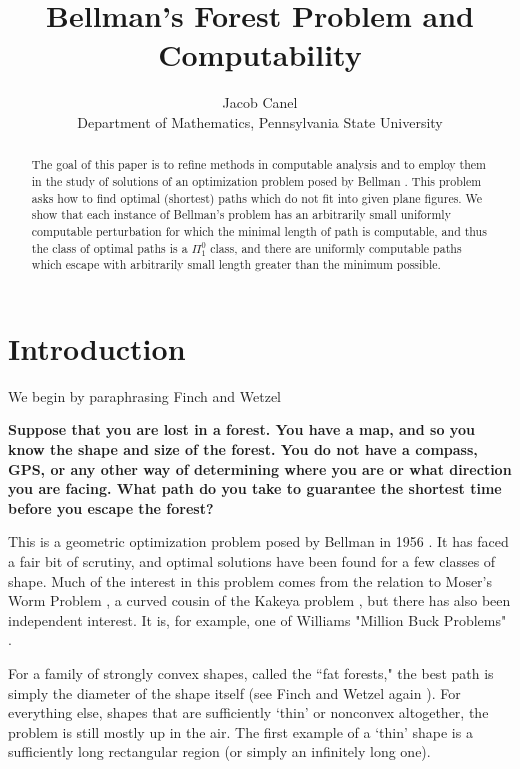 \documentclass{journal}
\title{Bellman's Forest Problem and Computability}
\author{Jacob Canel\\ Department of Mathematics, Pennsylvania State University}
\theoremstyle{definition}
\begin{document}
\begin{abstract}    %

The goal of this paper is to refine methods in computable analysis and to employ them in the study of solutions of an optimization problem posed by Bellman \cite{bell}. This problem asks how to find optimal (shortest) paths which do not fit into given plane figures. We show that each instance of Bellman's problem has an arbitrarily small uniformly computable perturbation for which the minimal length of path is computable, and thus the class of optimal paths is a $\Pi_1^0$ class, and there are uniformly computable paths which escape with arbitrarily small length greater than the minimum possible.

\end{abstract}

\maketitle

\section{Introduction}
\label{sec:intro}
We begin by paraphrasing Finch and Wetzel \cite{finch2004lost}
\begin{center}
    \textbf{Suppose that you are lost in a forest. You have a map, and so you know the shape and size of the forest. You do not have a compass, GPS, or any other way of determining where you are or what direction you are facing. What path do you take to guarantee the shortest time before you escape the forest?}
\end{center}

This is a geometric optimization problem posed by Bellman in 1956 \cite{bell}. It has faced a fair bit of scrutiny, and optimal solutions have been found for a few classes of shape. Much of the interest in this problem comes from the relation to Moser's Worm Problem \cite{moser1966poorly}, a curved cousin of the Kakeya problem \cite{kakeya}, but there has also been independent interest. It is, for example, one of Williams "Million Buck Problems" \cite{williams2002million}. 

For a family of strongly convex shapes, called the ``fat forests," the best path is simply the diameter of the shape itself (see Finch and Wetzel again \cite{finch2004lost}). For everything else, shapes that are sufficiently `thin' or nonconvex altogether, the problem is still mostly up in the air. The first example of a `thin' shape is a sufficiently long rectangular region (or simply an infinitely long one). 
\end{document}
